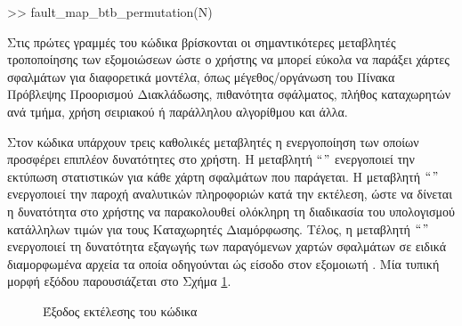 \begin{center}
    \begin{tcolorbox}[width=0.9\linewidth]
        \ttfamily
        >> fault\_map\_btb\_permutation(N)
    \end{tcolorbox}
\end{center}

Στις πρώτες γραμμές του κώδικα βρίσκονται οι σημαντικότερες μεταβλητές τροποποίησης των εξομοιώσεων ώστε ο χρήστης να μπορεί εύκολα να παράξει χάρτες σφαλμάτων για διαφορετικά μοντέλα, όπως μέγεθος/οργάνωση του Πίνακα Πρόβλεψης Προορισμού Διακλάδωσης, πιθανότητα σφάλματος, πλήθος καταχωρητών ανά τμήμα, χρήση σειριακού ή παράλληλου αλγορίθμου και άλλα.
\par
Στον κώδικα υπάρχουν τρεις καθολικές μεταβλητές η ενεργοποίηση των οποίων προσφέρει επιπλέον δυνατότητες στο χρήστη. Η μεταβλητή $``$\textit{}$"$ ενεργοποιεί την εκτύπωση στατιστικών για κάθε χάρτη σφαλμάτων που παράγεται. Η μεταβλητή $``$\textit{}$"$ ενεργοποιεί την παροχή αναλυτικών πληροφοριών κατά την εκτέλεση, ώστε να δίνεται η δυνατότητα στο χρήστης να παρακολουθεί ολόκληρη τη διαδικασία του υπολογισμού κατάλληλων τιμών για τους Καταχωρητές Διαμόρφωσης. Τέλος, η μεταβλητή $``$\textit{}$"$ ενεργοποιεί τη δυνατότητα εξαγωγής των παραγόμενων χαρτών σφαλμάτων σε ειδικά διαμορφωμένα αρχεία τα οποία οδηγούνται ώς είσοδο στον εξομοιωτή \gem. Μία τυπική μορφή εξόδου παρουσιάζεται στο Σχήμα \ref{fig:chap7_matlab_output}.

\begin{figure}[!b]
    \centering
    \caption{Έξοδος εκτέλεσης του κώδικα \matlab}
    \label{fig:chap7_matlab_output}
\end{figure}


\section{\gem}
\label{chap7_gem5}

